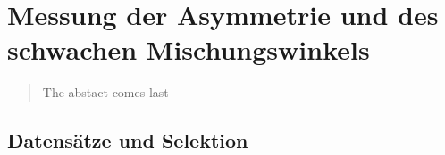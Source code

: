 


\chapter{Messung der Asymmetrie und des schwachen Mischungswinkels}
\label{afb}

\begin{quote}
    The abstact comes last
\end{quote}



\section{Datensätze und Selektion}
\label{afb:selection}



